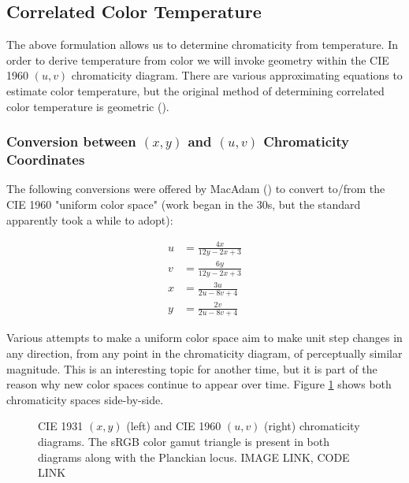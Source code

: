 \documentclass{article}
\newif\ifinvert
\begin{document}
\subsection{Correlated Color Temperature} %

The above formulation allows us to determine chromaticity from temperature.  In order to derive temperature from color we will invoke geometry within the CIE 1960 $(u,v)$ chromaticity diagram.  There are various approximating equations to estimate color temperature, but the original method of determining correlated color temperature is geometric (\cite{kelly1963lines}).

\subsubsection{Conversion between $(x,y)$ and $(u,v)$ Chromaticity Coordinates} %

The following conversions were offered by MacAdam (\cite{macadam1937projective}) to convert to/from the CIE 1960 "uniform color space" (work began in the 30s, but the standard apparently took a while to adopt):

\begin{equation} %
    \begin{aligned}
        u&=\frac{4x}{12y-2x+3}\\
        v&=\frac{6y}{12y-2x+3}\\
        x&=\frac{3u}{2u-8v+4}\\
        y&=\frac{2v}{2u-8v+4}
    \end{aligned}
\end{equation}

Various attempts to make a uniform color space aim to make unit step changes in any direction, from any point in the chromaticity diagram, of perceptually similar magnitude.  This is an interesting topic for another time, but it is part of the reason why new color spaces continue to appear over time.  Figure \ref{fig:two_chromaticity_spaces} shows both chromaticity spaces side-by-side.

\begin{figure} %
    \ifinvert
        
    \else
        
    \fi
    \caption{CIE 1931 $(x,y)$ (left) and CIE 1960 $(u,v)$ (right) chromaticity diagrams.  The sRGB color gamut triangle is present in both diagrams along with the Planckian locus.  IMAGE LINK, CODE LINK}\label{fig:two_chromaticity_spaces}
\end{figure}
\end{document}
